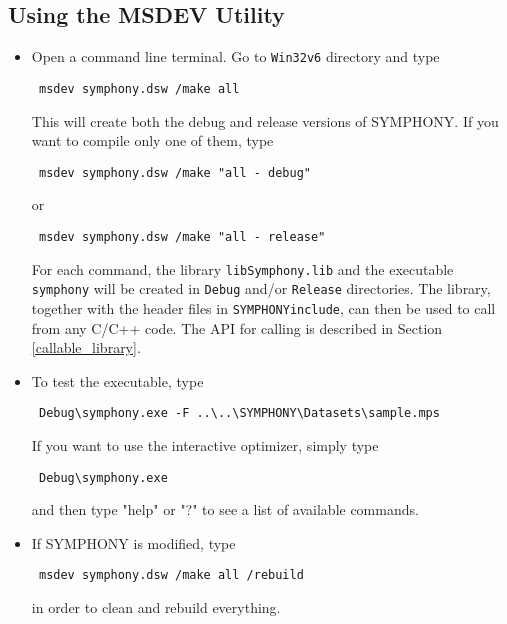 \subsection{Using the MSDEV Utility}
\label{using_msdev}
\begin{itemize}
\item Open a command line terminal. Go to \texttt{Win32\bs v6} directory and 
type
{\color{Brown}
\begin{verbatim}
 msdev symphony.dsw /make all
\end{verbatim}
}
This will create both the debug and release versions of SYMPHONY. If you 
want to compile only one of them, type
{\color{Brown}
\begin{verbatim}
 msdev symphony.dsw /make "all - debug"
\end{verbatim}
}
or 
{\color{Brown}
\begin{verbatim}
 msdev symphony.dsw /make "all - release"
\end{verbatim}
}
For each command, the library \texttt{libSymphony.lib} and the executable 
\texttt{symphony} will be created in \texttt{Debug} and/or \texttt{Release}
directories.  The library, together with the header files in 
\texttt{SYMPHONY\bs include\bs}, can then be 
used to call \BB from any C/C++ code. The API for calling \BB is 
described in Section \ref{callable_library}.

\item To test the executable, type 
{\color{Brown}
\begin{verbatim}
 Debug\symphony.exe -F ..\..\SYMPHONY\Datasets\sample.mps
\end{verbatim}
}
If you want to use the interactive optimizer, simply type
{\color{Brown}
\begin{verbatim}
 Debug\symphony.exe
\end{verbatim}
}
and then type "help" or "?" to see a list of available commands.

\item If SYMPHONY is modified, type 
{\color{Brown}
\begin{verbatim}
 msdev symphony.dsw /make all /rebuild
\end{verbatim}
}
in order to clean and rebuild everything.
\end{itemize} 
